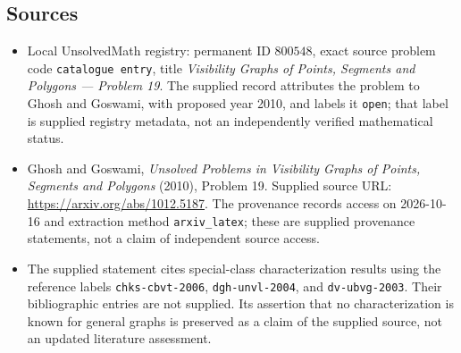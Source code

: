 \documentclass[11pt]{article}
\begin{document}
\subsection{Sources}
\begin{itemize}
\item Local UnsolvedMath registry: permanent ID \(800548\), exact source problem code \texttt{catalogue entry}, title \emph{Visibility Graphs of Points, Segments and Polygons --- Problem 19}. The supplied record attributes the problem to Ghosh and Goswami, with proposed year 2010, and labels it \texttt{open}; that label is supplied registry metadata, not an independently verified mathematical status.
\item Ghosh and Goswami, \emph{Unsolved Problems in Visibility Graphs of Points, Segments and Polygons} (2010), Problem 19. Supplied source URL: \url{https://arxiv.org/abs/1012.5187}. The provenance records access on 2026-10-16 and extraction method \texttt{arxiv\_latex}; these are supplied provenance statements, not a claim of independent source access.
\item The supplied statement cites special-class characterization results using the reference labels \texttt{chks-cbvt-2006}, \texttt{dgh-unvl-2004}, and \texttt{dv-ubvg-2003}. Their bibliographic entries are not supplied. Its assertion that no characterization is known for general graphs is preserved as a claim of the supplied source, not an updated literature assessment.
\end{itemize}
\end{document}
